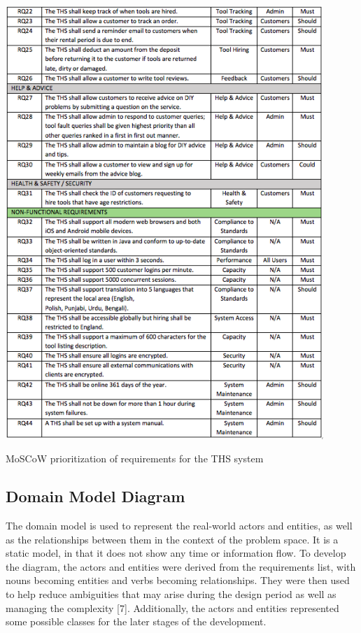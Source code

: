 \begin{table}[H]
      \centering
      \includegraphics[trim = 0 0 0 0, clip, width=0.9\textwidth]{TempImg/req2.png}
      \caption{MoSCoW prioritization of requirements for the THS system}
 \end{table}

\hypertarget{domain-model-diagram}{%
\subsection{Domain Model Diagram}\label{domain-model-diagram}}

The domain model is used to represent the real-world actors and
entities, as well as the relationships between them in the context of
the problem space. It is a static model, in that it does not show any
time or information flow. To develop the diagram, the actors and
entities were derived from the requirements list, with nouns becoming
entities and verbs becoming relationships. They were then used to help
reduce ambiguities that may arise during the design period as well as
managing the complexity {[}7{]}. Additionally, the actors and entities
represented some possible classes for the later stages of the
development.

